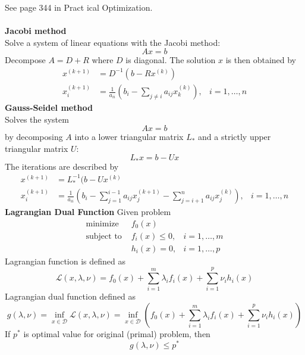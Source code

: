 \documentclass[12pt,a4paper]{report}
\begin{document}
See page 344 in Pract	ical Optimization.
\clearpage
{}\\\\
\textbf{Jacobi method}\\
Solve a system of linear equations with the Jacobi method:
\begin{equation}
Ax=b
\end{equation}
Decompose $A=D+R$ where $D$ is diagonal. The solution $x$ is then obtained by
\begin{align*}
x^{(k+1)}&=D^{-1}(b-Rx^{(k)})\\
x_i^{(k+1)}&=\frac{1}{a_{ii}}\left(b_i-\sum_{j\neq i}a_{ij}x_k^{(k)}\right),&i=1,\ldots,n
\end{align*}
\textbf{Gauss-Seidel method}\\
Solves the system
\begin{equation}
Ax=b
\end{equation}
by decomposing $A$ into a lower triangular matrix $L_*$ and a strictly upper triangular matrix $U$:
\begin{equation}
L_*x=b-Ux
\end{equation}
The iterations are described by
\begin{align*}
x^{(k+1)}&=L_*^{-1}(b-Ux^{(k)}\\
x_i^{(k+1)}&=\frac{1}{a_{ii}}\left(b_i-\sum_{j=1}^{i-1}a_{ij}x_j^{(k+1)}-\sum_{j=i+1}^na_{ij}x_j^{(k)}\right),&i=1,\ldots,n
\end{align*}
\textbf{Lagrangian Dual Function}
Given problem
\begin{align*}
\text{minimize }&f_0(x)\\
\text{subject to }&f_i(x)\leq0,&i=1,\ldots,m\\
&h_i(x)=0,&i=1,\ldots,p
\end{align*}
Lagrangian function is defined as
\begin{equation}
\mathcal{L}(x,\lambda,\nu)=f_0(x)+\sum_{i=1}^m\lambda_if_i(x)+\sum_{i=1}^p\nu_ih_i(x)
\end{equation}
Lagrangian dual function defined as
\begin{equation}
g(\lambda,\nu)=\inf_{x\in \mathcal{D}}\mathcal{L}(x,\lambda,\nu)=\inf_{x\in \mathcal{D}}\left(f_0(x)+\sum_{i=1}^m\lambda_if_i(x)+\sum_{i=1}^p\nu_ih_i(x)\right)
\end{equation}
If $p^*$ is optimal value for original (primal) problem, then
\begin{equation}
g(\lambda,\nu)\leq p^*
\end{equation}
\end{document}
